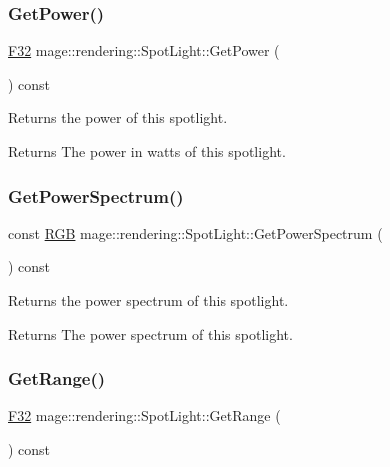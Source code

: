 \subsubsection{\texorpdfstring{Get\+Power()}{GetPower()}}
{\footnotesize\ttfamily \hyperlink{namespacemage_aa97e833b45f06d60a0a9c4fc22ae02c0}{F32} mage\+::rendering\+::\+Spot\+Light\+::\+Get\+Power (\begin{DoxyParamCaption}{ }\end{DoxyParamCaption}) const\hspace{0.3cm}{\ttfamily [noexcept]}}

Returns the power of this spotlight.

\begin{DoxyReturn}{Returns}
The power in watts of this spotlight. 
\end{DoxyReturn}
\hypertarget{classmage_1_1rendering_1_1_spot_light_a6dfa36c830bfa2878c04740c8c5f2e3b}{}\label{classmage_1_1rendering_1_1_spot_light_a6dfa36c830bfa2878c04740c8c5f2e3b} 
\subsubsection{\texorpdfstring{Get\+Power\+Spectrum()}{GetPowerSpectrum()}}
{\footnotesize\ttfamily const \hyperlink{structmage_1_1_r_g_b}{R\+GB} mage\+::rendering\+::\+Spot\+Light\+::\+Get\+Power\+Spectrum (\begin{DoxyParamCaption}{ }\end{DoxyParamCaption}) const\hspace{0.3cm}{\ttfamily [noexcept]}}

Returns the power spectrum of this spotlight.

\begin{DoxyReturn}{Returns}
The power spectrum of this spotlight. 
\end{DoxyReturn}
\hypertarget{classmage_1_1rendering_1_1_spot_light_a14383d05dafe535cf0cc162e3015181e}{}\label{classmage_1_1rendering_1_1_spot_light_a14383d05dafe535cf0cc162e3015181e} 
\subsubsection{\texorpdfstring{Get\+Range()}{GetRange()}}
{\footnotesize\ttfamily \hyperlink{namespacemage_aa97e833b45f06d60a0a9c4fc22ae02c0}{F32} mage\+::rendering\+::\+Spot\+Light\+::\+Get\+Range (\begin{DoxyParamCaption}{ }\end{DoxyParamCaption}) const\hspace{0.3cm}{\ttfamily [noexcept]}}

